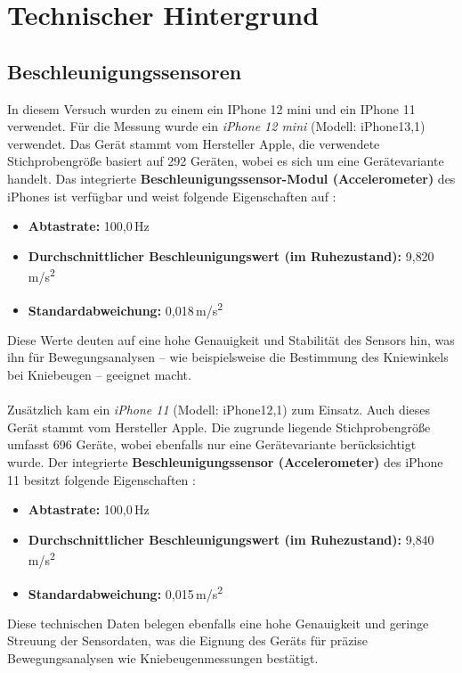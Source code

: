 \section{Technischer Hintergrund}
\subsection{ Beschleunigungssensoren}
\noindent In diesem Versuch wurden zu einem ein IPhone 12 mini und ein IPhone 11 verwendet. 
Für die Messung wurde ein \textit{iPhone 12 mini} (Modell: iPhone13,1) verwendet. Das Gerät stammt vom Hersteller Apple, die verwendete Stichprobengröße basiert auf 292 Geräten, wobei es sich um eine Gerätevariante handelt. Das integrierte \textbf{Beschleunigungssensor-Modul (Accelerometer)} des iPhones ist verfügbar und weist folgende Eigenschaften auf \cite{phyphoxSensorDB}:
\begin{itemize}
  \item \textbf{Abtastrate:} 100{,}0\,Hz
  \item \textbf{Durchschnittlicher Beschleunigungswert (im Ruhezustand):} 9{,}820\,m/s\textsuperscript{2}
  \item \textbf{Standardabweichung:} 0{,}018\,m/s\textsuperscript{2}
\end{itemize}
\noindent Diese Werte deuten auf eine hohe Genauigkeit und Stabilität des Sensors hin, was ihn für Bewegungsanalysen – wie beispielsweise die Bestimmung des Kniewinkels bei Kniebeugen – geeignet macht.
\\
\\
Zusätzlich kam ein \textit{iPhone 11} (Modell: iPhone12,1) zum Einsatz. Auch dieses Gerät stammt vom Hersteller Apple. Die zugrunde liegende Stichprobengröße umfasst 696 Geräte, wobei ebenfalls nur eine Gerätevariante berücksichtigt wurde. Der integrierte \textbf{Beschleunigungssensor (Accelerometer)} des iPhone 11 besitzt folgende Eigenschaften \cite{phyphoxSensorDB}:
\begin{itemize}
  \item \textbf{Abtastrate:} 100{,}0\,Hz
  \item \textbf{Durchschnittlicher Beschleunigungswert (im Ruhezustand):} 9{,}840\,m/s\textsuperscript{2}
  \item \textbf{Standardabweichung:} 0{,}015\,m/s\textsuperscript{2}
\end{itemize} 
\noindent Diese technischen Daten belegen ebenfalls eine hohe Genauigkeit und geringe Streuung der Sensordaten, was die Eignung des Geräts für präzise Bewegungsanalysen wie Kniebeugenmessungen bestätigt. 

